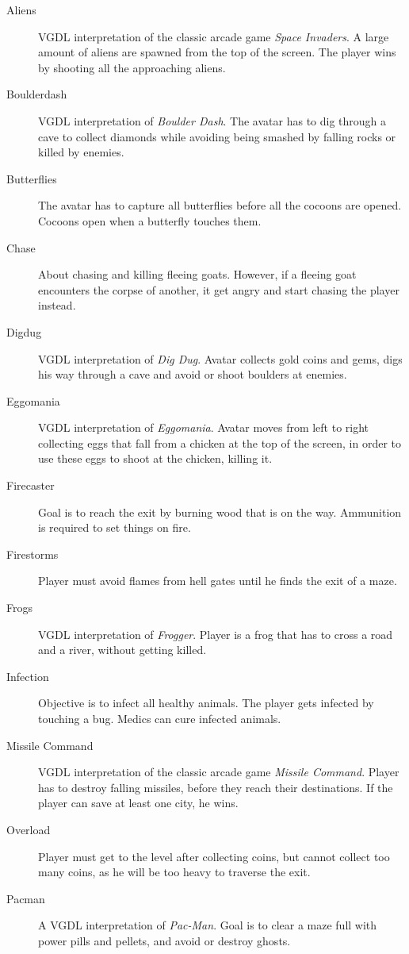 \documentclass[a4paper,titlepage,final]{report}
\begin{document}
\begin{appendices}
\begin{description}
\item [Aliens] VGDL interpretation of the classic arcade game \emph{Space Invaders}. A large amount of aliens are spawned from the top of the screen. The player wins by shooting all the approaching aliens.
\item [Boulderdash] VGDL interpretation of \emph{Boulder Dash}. The avatar has to dig through a cave to collect diamonds while avoiding being smashed by falling rocks or killed by enemies. 
\item [Butterflies] The avatar has to capture all butterflies before all the cocoons are opened. Cocoons open when a butterfly touches them.
\item [Chase] About chasing and killing fleeing goats. However, if a fleeing goat encounters the corpse of another, it get angry and start chasing the player instead.
\item [Digdug] VGDL interpretation of \emph{Dig Dug}. Avatar collects gold coins and gems, digs his way through a cave and avoid or shoot boulders at enemies.
\item [Eggomania] VGDL interpretation of \emph{Eggomania}. Avatar moves from left to right collecting eggs that fall from a chicken at the top of the screen, in order to use these eggs to shoot at the chicken, killing it.
\item [Firecaster] Goal is to reach the exit by burning wood that is on the way. Ammunition is required to set things on fire.
\item [Firestorms] Player must avoid flames from hell gates until he finds the exit of a maze.
\item [Frogs] VGDL interpretation of \emph{Frogger}. Player is a frog that has to cross a road and a river, without getting killed.
\item [Infection] Objective is to infect all healthy animals. The player gets infected by touching a bug. Medics can cure infected animals.
\item [Missile Command] VGDL interpretation of the classic arcade game \emph{Missile Command}. Player has to destroy falling missiles, before they reach their destinations. If the player can save at least one city, he wins.
\item [Overload] Player must get to the level after collecting coins, but cannot collect too many coins, as he will be too heavy to traverse the exit.
\item [Pacman] A VGDL interpretation of \emph{Pac-Man}. Goal is to clear a maze full with power pills and pellets, and avoid or destroy ghosts.

\end{description}
\end{appendices}
\end{document}
